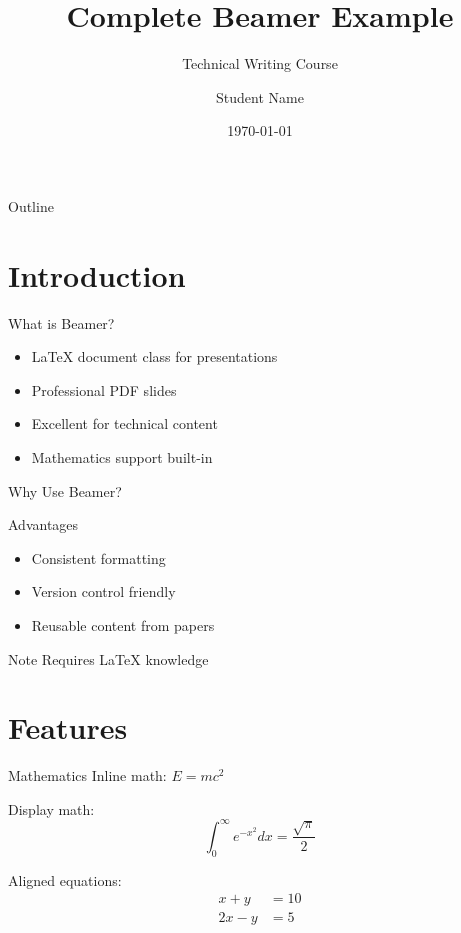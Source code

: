 \documentclass{beamer}
\title{Complete Beamer Example}
\subtitle{Technical Writing Course}
\author{Student Name}
\institute{MNIT Jaipur}
\date{\today}
\begin{document}
\begin{frame}
  \titlepage
\end{frame}

\begin{frame}{Outline}
  \tableofcontents
\end{frame}

\section{Introduction}

\begin{frame}{What is Beamer?}
  \begin{itemize}
    \item LaTeX document class for presentations
    \item Professional PDF slides
    \item Excellent for technical content
    \item Mathematics support built-in
  \end{itemize}
\end{frame}

\begin{frame}{Why Use Beamer?}
  \begin{block}{Advantages}
    \begin{itemize}
      \item Consistent formatting
      \item Version control friendly
      \item Reusable content from papers
    \end{itemize}
  \end{block}
  
  \begin{alertblock}{Note}
    Requires LaTeX knowledge
  \end{alertblock}
\end{frame}

\section{Features}

\begin{frame}{Mathematics}
  Inline math: $E = mc^2$
  
  \bigskip
  Display math:
  \[
    \int_0^\infty e^{-x^2} dx = \frac{\sqrt{\pi}}{2}
  \]
  
  \bigskip
  Aligned equations:
  \begin{align*}
    x + y &= 10 \\
    2x - y &= 5
  \end{align*}
\end{frame}
\end{document}
